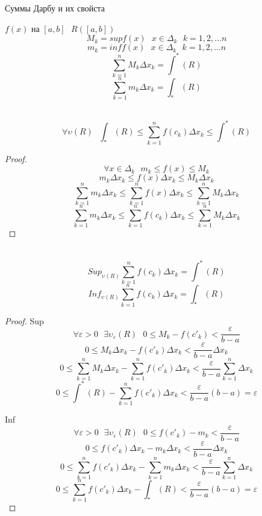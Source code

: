 \begin{title}[\Large]
  Суммы Дарбу и их свойста
\end{title}

$f(x)$ на $[a, b] ~~~ R([a, b])$
\[M_k = sup f(x) ~~~ x \in \Delta_k ~~~ k = 1, 2, \ldots n\]
\[m_k = inf f(x) ~~~ x \in \Delta_k ~~~ k = 1, 2, \ldots n\]
\[\sum^{n}_{k = 1}M_k \Delta x_k = \int^* (R)\]
\[\sum^{n}_{k = 1}m_k \Delta x_k = \int_* (R)\]


\\
$$
\forall \upsilon(R) ~~~\int_* (R) \le \sum_{k = 1}^{n} f(c_k) \Delta x_k \le
\int^* (R)
$$
\begin{proof}
  \[\forall x \in \Delta_k ~~~ m_k \le f(x) \le M_k\]
  \[
     m_k \Delta x_k \le f(x) \Delta x_k \le
     M_k \Delta x_k
  \]
  \[
     \sum_{k = 1}^{n} m_k \Delta x_k \le \sum_{k = 1}^{n} f(x)
     \Delta x_k \le \sum_{k = 1}^{n} M_k \Delta x_k
  \]
  \[
     \sum_{k = 1}^{n} m_k \Delta x_k \le \sum_{k = 1}^{n} f(c_k)
    \Delta x_k \le \sum_{k = 1}^{n} M_k \Delta x_k
  \]
\end{proof}

\\
\[Sup_{\upsilon (R)} \sum_{k = 1}^{n} f(c_k) \Delta x_k = \int^* (R)\]
\[Inf_{\upsilon (R)} \sum_{k = 1}^{n} f(c_k) \Delta x_k = \int_* (R)\]

\begin{proof}
  Sup
  \[
     \forall \varepsilon > 0 ~~~ \exists \upsilon_\varepsilon (R) ~~~ 0 \le
     M_k - f(c'_k) < \frac{\varepsilon}{b - a}
  \]
  \[
     0 \le M_k \Delta x_k - f(c'_k) \Delta x_k <
     \frac{\varepsilon}{b - a}\Delta x_k
  \]
  \[
     0 \le \sum_{k = 1}^{n} M_k \Delta x_k - \sum_{k = 1}^{n} f(c'_k)
     \Delta x_k < \frac{\varepsilon}{b - a} \sum_{k = 1}^{n} \Delta x_k
  \]
  \[
     0 \le \int^* (R) - \sum_{k = 1}^{n} f(c'_k) \Delta x_k <
     \frac{\varepsilon}{b - a} (b - a) = \varepsilon
  \]

  Inf
  \[
     \forall \varepsilon > 0 ~~~ \exists \upsilon_\varepsilon (R) ~~~ 0 \le
      f(c'_k) - m_k < \frac{\varepsilon}{b - a}
  \]
  \[
     0 \le f(c'_k) \Delta x_k - m_k \Delta x_k <
     \frac{\varepsilon}{b - a}\Delta x_k
  \]
  \[
     0 \le \sum_{k = 1}^{n} f(c'_k) \Delta x_k - \sum_{k = 1}^{n} m_k \Delta x_k
     < \frac{\varepsilon}{b - a} \sum_{k = 1}^{n} \Delta x_k
  \]
  \[
     0 \le \sum_{k = 1}^{n} f(c'_k) \Delta x_k - \int_* (R) <
     \frac{\varepsilon}{b - a} (b - a) = \varepsilon
  \]
\end{proof}

